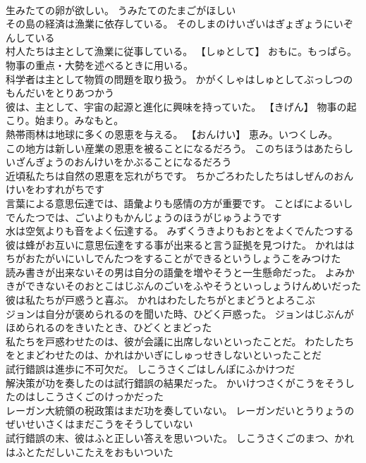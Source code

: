 \documentclass[8pt]{extreport}
\begin{document}
\begin{CJK}{UTF8}{min}
\\	生みたての卵が欲しい。	うみたてのたまごがほしい 
\\	その島の経済は漁業に依存している。	そのしまのけいざいはぎょぎょうにいぞんしている 
\\	村人たちは主として漁業に従事している。	【しゅとして】 おもに。もっぱら。物事の重点・大勢を述べるときに用いる。
\\	科学者は主として物質の問題を取り扱う。	かがくしゃはしゅとしてぶっしつのもんだいをとりあつかう 
\\	彼は、主として、宇宙の起源と進化に興味を持っていた。	【きげん】 物事の起こり。始まり。みなもと。
\\	熱帯雨林は地球に多くの恩恵を与える。	【おんけい】 恵み。いつくしみ。
\\	この地方は新しい産業の恩恵を被ることになるだろう。	このちほうはあたらしいざんぎょうのおんけいをかぶることになるだろう 
\\	近頃私たちは自然の恩恵を忘れがちです。	ちかごろわたしたちはしぜんのおんけいをわすれがちです 
\\	言葉による意思伝達では、語彙よりも感情の方が重要です。	ことばによるいしでんたつでは、ごいよりもかんじょうのほうがじゅうようです 
\\	水は空気よりも音をよく伝達する。	みずくうきよりもおとをよくでんたつする 
\\	彼は蜂がお互いに意思伝達をする事が出来ると言う証拠を見つけた。	かれははちがおたがいにいしでんたつをすることができるというしょうこをみつけた 
\\	読み書きが出来ないその男は自分の語彙を増やそうと一生懸命だった。	よみかきができないそのおとこはじぶんのごいをふやそうといっしょうけんめいだった 
\\	彼は私たちが戸惑うと喜ぶ。	かれはわたしたちがとまどうとよろこぶ 
\\	ジョンは自分が褒められるのを聞いた時、ひどく戸惑った。	ジョンはじぶんがほめられるのをきいたとき、ひどくとまどった 
\\	私たちを戸惑わせたのは、彼が会議に出席しないといったことだ。	わたしたちをとまどわせたのは、かれはかいぎにしゅっせきしないといったことだ 
\\	試行錯誤は進歩に不可欠だ。	しこうさくごはしんぽにふかけつだ 
\\	解決策が功を奏したのは試行錯誤の結果だった。	かいけつさくがこうをそうしたのはしこうさくごのけっかだった 
\\	レーガン大統領の税政策はまだ功を奏していない。	レーガンだいとうりょうのぜいせいさくはまだこうをそうしていない 
\\	試行錯誤の末、彼はふと正しい答えを思いついた。	しこうさくごのまつ、かれはふとただしいこたえをおもいついた 

\end{CJK}
\end{document}
